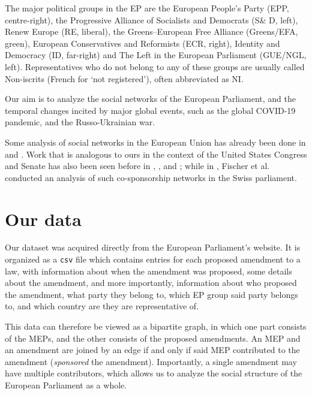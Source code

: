 \documentclass[lettersize,journal]{IEEEtran}
\begin{document}
The major political groups in the EP are the European People's Party (EPP, centre-right), the Progressive Alliance of Socialists and Democrats (S\& D, left), Renew Europe (RE, liberal), the Greens–European Free Alliance (Greens/EFA, green), European Conservatives and Reformists (ECR, right), Identity and Democracy (ID, far-right) and The Left in the European Parliament (GUE/NGL, left). Representatives who do not belong to any of these groups are usually called Non-iscrits (French for `not registered'), often abbreviated as NI.

Our aim is to analyze the social networks of the European Parliament, and the temporal changes incited by major global events, such as the global COVID-19 pandemic, and the Russo-Ukrainian war.

Some analysis of social networks in the European Union has already been done in \cite{Baller} and \cite{Cherepnalkoski}. Work that is analogous to ours in the context of the United States Congress and Senate has also been seen before in \cite{Desmarais}, \cite{Fowler}, \cite{Porter} and \cite{Tanger}; while in \cite{Fischer}, Fischer et al. conducted an analysis of such co-sponsorship networks in the Swiss parliament.


\section{Our data}

Our dataset was acquired directly from the European Parliament's website. It is organized as a \texttt{csv} file which contains entries for each proposed amendment to a law, with information about when the amendment was proposed, some details about the amendment, and more importantly, information about who proposed the amendment, what party they belong to, which EP group said party belongs to, and which country are they are representative of.


This data can therefore be viewed as a bipartite graph, in which one part consists of the MEPs, and the other consists of the proposed amendments. An MEP and an amendment are joined by an edge if and only if said MEP contributed to the amendment (\textit{sponsored} the amendment). Importantly, a single amendment may have multiple contributors, which allows us to analyze the social structure of the European Parliament as a whole.
\end{document}
